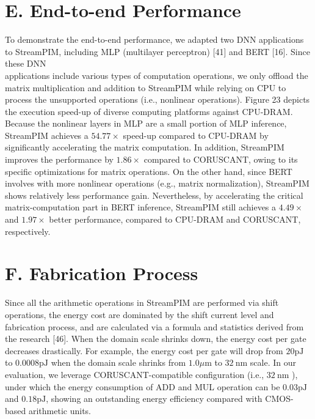 \documentclass[10pt]{article}
\begin{document}
\section*{E. End-to-end Performance}
To demonstrate the end-to-end performance, we adapted two DNN applications to StreamPIM, including MLP (multilayer perceptron) [41] and BERT [16]. Since these DNN\\
applications include various types of computation operations, we only offload the matrix multiplication and addition to StreamPIM while relying on CPU to process the unsupported operations (i.e., nonlinear operations). Figure 23 depicts the execution speed-up of diverse computing platforms against CPU-DRAM. Because the nonlinear layers in MLP are a small portion of MLP inference, StreamPIM achieves a $54.77 \times$ speed-up compared to CPU-DRAM by significantly accelerating the matrix computation. In addition, StreamPIM improves the performance by $1.86 \times$ compared to CORUSCANT, owing to its specific optimizations for matrix operations. On the other hand, since BERT involves with more nonlinear operations (e.g., matrix normalization), StreamPIM shows relatively less performance gain. Nevertheless, by accelerating the critical matrix-computation part in BERT inference, StreamPIM still achieves a $4.49 \times$ and $1.97 \times$ better performance, compared to CPU-DRAM and CORUSCANT, respectively.

\section*{F. Fabrication Process}
Since all the arithmetic operations in StreamPIM are performed via shift operations, the energy cost are dominated by the shift current level and fabrication process, and are calculated via a formula and statistics derived from the research [46]. When the domain scale shrinks down, the energy cost per gate decreases drastically. For example, the energy cost per gate will drop from $20 \mathrm{pJ}$ to $0.0008 \mathrm{pJ}$ when the domain scale shrinks from $1.0 \mu \mathrm{m}$ to $32 \mathrm{~nm}$ scale. In our evaluation, we leverage CORUSCANT-compatible configuration (i.e., $32 \mathrm{~nm}$ ), under which the energy consumption of ADD and MUL operation can be $0.03 \mathrm{pJ}$ and $0.18 \mathrm{pJ}$, showing an outstanding energy efficiency compared with CMOS-based arithmetic units.
\end{document}
